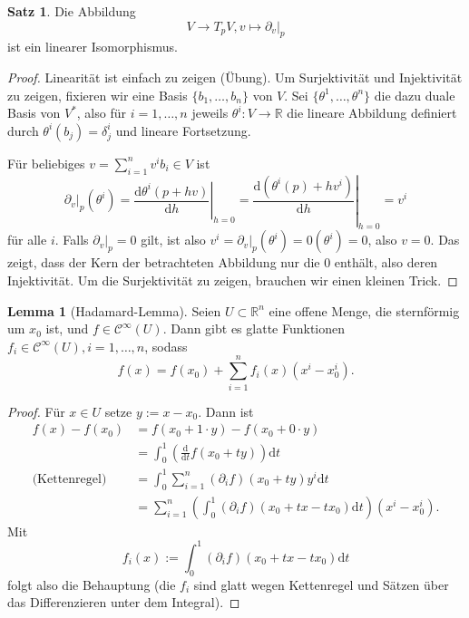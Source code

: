 \documentclass[a4paper]{scrbook}
\numberwithin{equation}{chapter}
\newcommand{\D}{\mathrm{d}}
\newcommand{\sC}{\mathcal{C}^{\infty}}
\theoremstyle{definition}
\newtheorem{lemma}[defn]{Lemma}
\newtheorem{satz}[defn]{Satz}
\begin{document}
\begin{satz} \label{satz:tangt_vr}
	Die Abbildung \[V \to T_pV, v \mapsto \left.\partial_v\right|_p\] ist ein linearer Isomorphismus.
	
	\begin{proof}\let\qed\relax
		Linearität ist einfach zu zeigen (Übung). Um Surjektivität und Injektivität zu zeigen, fixieren wir eine Basis $\{b_1,\dots,b_n\}$ von $V$. Sei $\{\theta^1, \dots, \theta^n\}$ die dazu duale Basis von $V^*$, also für $i = 1, \dots, n$ jeweils $\theta^i\colon V \to \mathbb R$ die lineare Abbildung definiert durch $\theta^i(b_j) = \delta^i_j$ und lineare Fortsetzung.

		Für beliebiges $v = \sum_{i=1}^n v^i b_i \in V$ ist
		\begin{equation} \label{eq:pf_tangt_vr}
			\left.\partial_v\right|_p(\theta^i) = \left.\frac{\D\theta^i(p + h v)}{\D h}\right|_{h=0} = \left.\frac{\D(\theta^i(p) + h v^i)}{\D h}\right|_{h=0} = v^i
		\end{equation}
		für alle $i$. Falls $\left.\partial_v\right|_p = 0$ gilt, ist also $v^i = \left.\partial_v\right|_p(\theta^i) = 0(\theta^i) = 0$, also $v=0$. Das zeigt, dass der Kern der betrachteten Abbildung nur die 0 enthält, also deren Injektivität. Um die Surjektivität zu zeigen, brauchen wir einen kleinen Trick.
	\end{proof}
\end{satz}

\begin{lemma}[Hadamard-Lemma] \label{lemma:Hadamard}
	Seien $U \subset \mathbb R^n$ eine offene Menge, die sternförmig um $x_0$ ist, und $f \in \sC(U)$. Dann gibt es glatte Funktionen $f_i \in \sC(U), i = 1,\dots,n$, sodass \[f(x) = f(x_0) + \sum_{i=1}^n f_i(x) (x^i - x_0^i).\]
	
	\begin{proof}
		Für $x \in U$ setze $y := x - x_0$. Dann ist
		\begin{align*}
		f(x) - f(x_0) &= f(x_0 + 1\cdot y) - f(x_0 + 0\cdot y)\\
		&= \int_0^1 \left(\frac{\D}{\D t} f(x_0 + ty)\right) \D t\\
		\text{(Kettenregel)} \quad &= \int_0^1 \sum_{i=1}^n (\partial_i f)(x_0 + ty) y^i \D t\\
		&= \sum_{i=1}^n \left(\int_0^1 (\partial_i f)(x_0 + tx - tx_0) \D t\right) (x^i - x_0^i).
		\end{align*}
		Mit \[f_i(x) := \int_0^1 (\partial_i f)(x_0 + tx - tx_0) \D t\] folgt also die Behauptung (die $f_i$ sind glatt wegen Kettenregel und Sätzen über das Differenzieren unter dem Integral).
	\end{proof}
\end{lemma}
\end{document}
